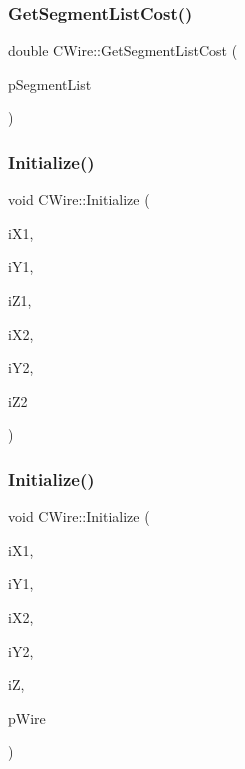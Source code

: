 \subsubsection{\texorpdfstring{GetSegmentListCost()}{GetSegmentListCost()}}
{\footnotesize\ttfamily double C\+Wire\+::\+Get\+Segment\+List\+Cost (\begin{DoxyParamCaption}\item[{vector$<$ \mbox{\hyperlink{classCSegment}{C\+Segment}} $\ast$ $>$ $\ast$}]{p\+Segment\+List }\end{DoxyParamCaption})\hspace{0.3cm}{\ttfamily [static]}}

\mbox{\label{classCWire_a32e6d904a2f532d7b6d489d8ffe4884f}} 
\subsubsection{\texorpdfstring{Initialize()}{Initialize()}\hspace{0.1cm}{\footnotesize\ttfamily [1/3]}}
{\footnotesize\ttfamily void C\+Wire\+::\+Initialize (\begin{DoxyParamCaption}\item[{int}]{i\+X1,  }\item[{int}]{i\+Y1,  }\item[{int}]{i\+Z1,  }\item[{int}]{i\+X2,  }\item[{int}]{i\+Y2,  }\item[{int}]{i\+Z2 }\end{DoxyParamCaption})}

\mbox{\label{classCWire_abda250d5147d4fcf3721d4d89d238606}} 
\subsubsection{\texorpdfstring{Initialize()}{Initialize()}\hspace{0.1cm}{\footnotesize\ttfamily [2/3]}}
{\footnotesize\ttfamily void C\+Wire\+::\+Initialize (\begin{DoxyParamCaption}\item[{int}]{i\+X1,  }\item[{int}]{i\+Y1,  }\item[{int}]{i\+X2,  }\item[{int}]{i\+Y2,  }\item[{int}]{iZ,  }\item[{\mbox{\hyperlink{classCWire}{C\+Wire}} $\ast$}]{p\+Wire }\end{DoxyParamCaption})\hspace{0.3cm}{\ttfamily [virtual]}}

